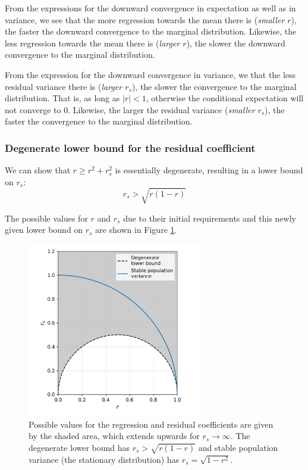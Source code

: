 \documentclass[letterpaper,10pt]{article} %
\begin{document}
From the expressions for the downward convergence in expectation as well as in variance, we see that the more regression towards the mean there is (\emph{smaller $r$}), the faster the downward convergence to the marginal distribution. Likewise, the less regression towards the mean there is (\emph{larger $r$}), the slower the downward convergence to the marginal distribution. 

From the expression for the downward convergence in variance, we that the less residual variance there is (\emph{larger $r_s$}), the slower the convergence to the marginal distribution. That is, as long as $|r| < 1$, otherwise the conditional expectation will not converge to $0$.  Likewise, the larger the residual variance (\emph{smaller $r_s$}), the faster the convergence to the marginal distribution. 


\subsubsection*{Degenerate lower bound for the residual coefficient}
We can show that $r \geq r^2 + r_s^2$ is essentially degenerate, resulting in a lower bound on $r_s$:
$$r_s > \sqrt{r(1-r)}$$

The possible values for $r$ and $r_s$ due to their initial requirements and this newly given lower bound on $r_s$ are shown in Figure \ref{fig:possible_r_rs}. 

\begin{figure}[h]
\includegraphics[width=3in]{figures/possible_r_rs.png}
\centering
\caption{Possible values for the regression and residual coefficients are given by the shaded area, which extends upwards for $r_s \rightarrow \infty$. The degenerate lower bound has $r_s > \sqrt{r(1-r)}$ and stable population variance (the stationary distribution) has $r_s = \sqrt{1-r^2}$.}
\label{fig:possible_r_rs}
\end{figure}
\end{document}

